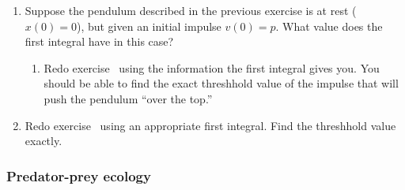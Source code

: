 \begin{enumerate}
\item Suppose the pendulum described in the previous exercise is at
rest ($x(0) = 0$), but given an initial impulse $v(0) = p$.  What
value does the first integral have in this case?

  \begin{enumerate}
  \item Redo exercise \thespina\ using the information the first integral
gives you.  You should be able to find the exact threshhold value of
the impulse that will push the pendulum ``over the top.''


\end{enumerate}
\item Redo exercise \thespinb\ using an appropriate first integral.
Find the threshhold value exactly.


\end{enumerate}
\subsubsection{Predator-prey ecology}
\label{subsubsec:predator-prey-ecology}




